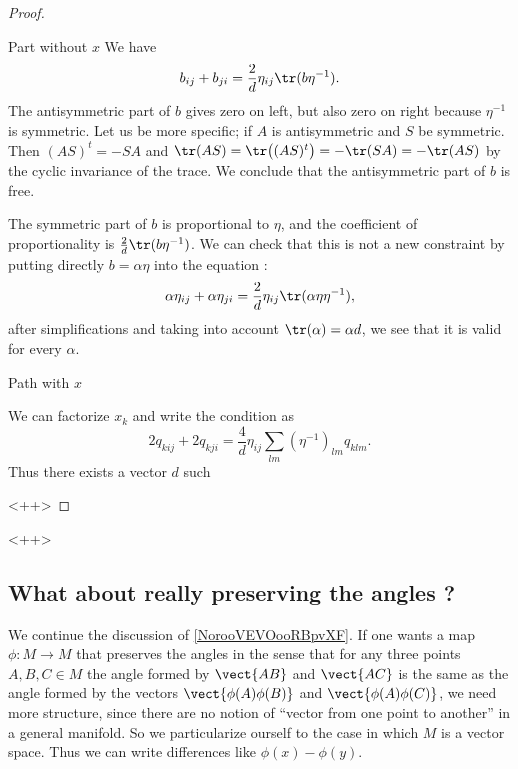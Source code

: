 \begin{proof}
    \begin{subproof}
    \item[Part without \( x\)]
        We have 
        \begin{equation}
            b_{ij}+b_{ji}=\frac{ 2 }{ d }\eta_{ij}\tr(b\eta^{-1}).
        \end{equation}
        The antisymmetric part of \( b\) gives zero on left, but also zero on right because \( \eta^{-1}\) is symmetric. Let us be more specific; if \( A\) is antisymmetric and \( S\) be symmetric. Then \( (AS)^t=-SA\) and \( \tr(AS)=\tr\big( (AS)^t \big)=-\tr(SA)=-\tr(AS)\) by the cyclic invariance of the trace. We conclude that the antisymmetric part of \( b\) is free.

        The symmetric part of \( b\) is proportional to \( \eta\), and the coefficient of proportionality is \( \frac{ 2 }{ d }\tr(b\eta^{-1})\). We can check that this is not a new constraint by putting directly \( b=\alpha\eta\) into the equation :
        \begin{equation}
            \alpha\eta_{ij}+\alpha\eta_{ji}=\frac{ 2 }{ d }\eta_{ij}\tr(\alpha\eta\eta^{-1}),
        \end{equation}
        after simplifications and taking into account \( \tr(\alpha)=\alpha d\), we see that it is valid for every \( \alpha\).
    \item[Path with \( x\)]

        We can factorize \( x_k\) and write the condition as
        \begin{equation}
            2q_{kij}+2q_{kji}=\frac{ 4 }{ d }\eta_{ij}\sum_{lm}(\eta^{-1})_{lm}q_{klm}.
        \end{equation}
        Thus there exists a vector \( d\) such

    \end{subproof}
    <++>

\end{proof}
<++>


\subsection{What about really preserving the angles ?}
\label{sebsecooCBKEooQOWqFo}

We continue the discussion of \ref{NorooVEVOooRBpvXF}. If one wants a map \( \phi\colon M\to M\) that preserves the angles in the sense that for any three points \( A,B,C\in M\) the angle formed by \( \vect{ AB }\) and \( \vect{ AC }\) is the same as the angle formed by the vectors \( \vect{ \phi(A)\phi(B) }\) and \( \vect{ \phi(A)\phi(C) }\), we need more structure, since there are no notion of ``vector from one point to another'' in a general manifold. So we particularize ourself to the case in which \( M\) is a vector space. Thus we can write differences like \( \phi(x)-\phi(y)\).

